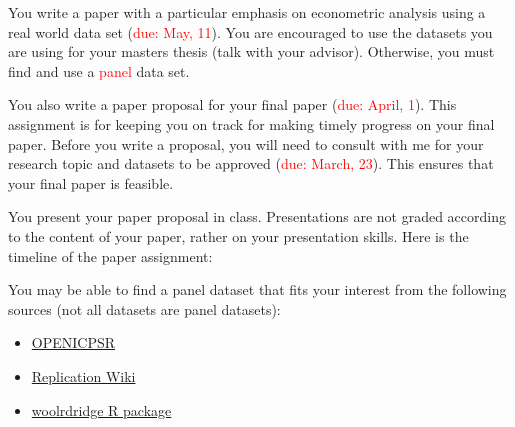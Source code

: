 \documentclass[12pt]{article}
\begin{document}
\begin{itemize}
	You write a paper with a particular emphasis on econometric analysis using a real world data set (\textcolor{red}{due: May, 11}). You are encouraged to use the datasets you are using for your masters thesis (talk with your advisor). Otherwise, you must find and use a \textcolor{red}{panel} data set. 

	You also write a paper proposal for your final paper (\textcolor{red}{due: April, 1}). This assignment is for keeping you on track for making timely progress on your final paper. Before you write a proposal, you will need to consult with me for your research topic and datasets to be approved (\textcolor{red}{due: March, 23}). This ensures that your final paper is feasible.  

	You present your paper proposal in class. Presentations are not graded according to the content of your paper, rather on your presentation skills. Here is the timeline of the paper assignment:

  You may be able to find a panel dataset that fits your interest from the following sources (not all datasets are panel datasets):

  \begin{itemize}
    \item \href{https://www.openicpsr.org/openicpsr/search/studies}{OPENICPSR}
    \item \href{https://blog.repec.org/2020/08/04/a-replication-database-for-economics-and-social-sciences-the-replicationwiki/}{Replication Wiki}
    \item \href{https://cran.r-project.org/web/packages/wooldridge/wooldridge.pdf}{woolrdridge R package}
  \end{itemize}
  

\end{itemize}

\vspace*{.15in}

\clearpage
\end{document}
